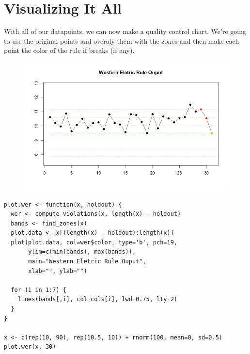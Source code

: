 \documentclass[a4paper,12pt]{article}
\begin{document}
\section{Visualizing It All}

With all of our datapoints, we can now make a quality control chart. We're going to use the original points and overaly them with the zones and then make each point the color of the rule if breaks (if any).
\begin{figure}
\centering
\includegraphics[width=0.7\linewidth]{./sqcr5}
\end{figure}

\begin{verbatim}
plot.wer <- function(x, holdout) {
  wer <- compute_violations(x, length(x) - holdout)
  bands <- find_zones(x)
  plot.data <- x[(length(x) - holdout):length(x)]
  plot(plot.data, col=wer$color, type='b', pch=19,
       ylim=c(min(bands), max(bands)),
       main="Western Eletric Rule Ouput",
       xlab="", ylab="")
  
  for (i in 1:7) {
    lines(bands[,i], col=cols[i], lwd=0.75, lty=2)
  }
}
 
x <- c(rep(10, 90), rep(10.5, 10)) + rnorm(100, mean=0, sd=0.5)
plot.wer(x, 30)
\end{verbatim}
\end{document}
